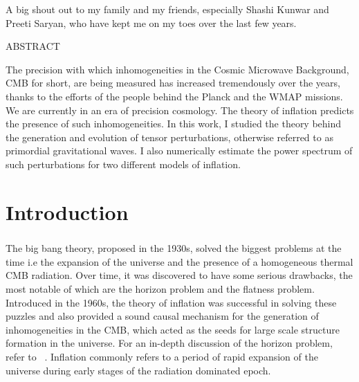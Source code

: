 \documentclass[12pt,a4paper,oneside]{book}
\begin{document}
A big shout out to my family and my friends, especially Shashi Kunwar
and Preeti Saryan, who have kept me on my toes over the last few years.
 

\newpage\topskip 40pt
\thispagestyle{empty}
\centerline{\Large ABSTRACT}
\vskip 20pt\noindent 

The precision with which inhomogeneities in the Cosmic Microwave Background, CMB for short, are being measured
has increased tremendously over the years, thanks to the efforts of the people behind the Planck and the WMAP 
missions. We are currently in an era of precision cosmology. The theory of inflation predicts the presence of such 
inhomogeneities. In this work, I studied the theory behind the generation and evolution of tensor perturbations, 
otherwise referred to as primordial gravitational waves. I also numerically estimate the power spectrum of such 
perturbations for two different models of inflation.

\newpage
\thispagestyle{empty}
\tableofcontents
\newpage


\newpage
\thispagestyle{empty}
\listoffigures
\newpage




\chapter{Introduction}

\paragraph*{} The big bang theory, proposed in the 1930s, solved the biggest problems at the time i.e the expansion of the universe and 
the presence of a homogeneous thermal CMB radiation. Over time, it was discovered to have some serious drawbacks, the most notable 
of which are the horizon problem and the flatness problem. Introduced in the 1960s, the theory of inflation was successful in solving 
these puzzles and also provided a sound causal mechanism for the generation of inhomogeneities in the CMB, which acted as the seeds 
for large scale structure formation in the universe. For an in-depth discussion of the horizon problem, refer to ~\cite{Sriramkumar L - 2009}.
Inflation commonly refers to a period of rapid expansion of the universe during early stages of the radiation dominated epoch.
\end{document}
